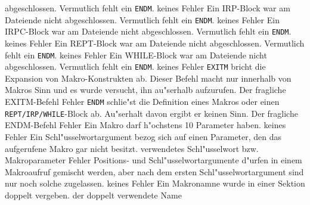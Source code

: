\documentclass[12pt,a4paper,twoside]{report}
\newcommand{\tty}[1]{{\tt #1}}
\begin{document}
\begin{description}
{                abgeschlossen.  Vermutlich fehlt ein \tty{ENDM}.}
               {keines}
               {Fehler}
               {Ein IRP-Block war am Dateiende nicht
                abgeschlossen.  Vermutlich fehlt ein \tty{ENDM}.}
               {keines}
               {Fehler}
               {Ein IRPC-Block war am Dateiende nicht
                abgeschlossen.  Vermutlich fehlt ein \tty{ENDM}.}
               {keines}
               {Fehler}
               {Ein REPT-Block war am Dateiende nicht
                abgeschlossen.  Vermutlich fehlt ein \tty{ENDM}.}
               {keines}
               {Fehler}
               {Ein WHILE-Block war am Dateiende nicht
                abgeschlossen.  Vermutlich fehlt ein \tty{ENDM}.}
               {keines}
               {Fehler}
               {\tty{EXITM} bricht die Expansion von
                Makro-Konstrukten ab.  Dieser Befehl macht nur innerhalb
                von Makros Sinn und es wurde versucht, ihn au"serhalb
                aufzurufen.}
               {Der fragliche EXITM-Befehl}
               {Fehler}
               {\tty{ENDM} schlie"st die Definition eines Makros oder einen
                \tty{REPT/IRP/WHILE}-Block ab.  Au"serhalt davon ergibt
                er keinen Sinn.}
               {Der fragliche ENDM-Befehl}
               {Fehler}
               {Ein Makro darf h"ochstens 10 Parameter haben.}
               {keines}
               {Fehler}
               {Ein Schl"usselwortargument bezog sich auf einen
                Parameter, den das aufgerufene Makro gar nicht
                besitzt.}
               {verwendetes Schl"usselwort bzw. Makroparameter}
               {Fehler}
               {Positions- und Schl"usselwortargumente d"urfen in
                einem Makroaufruf gemischt werden, aber nach dem
                ersten Schl"usselwortargument sind nur noch
                solche zugelassen.}
               {keines}
               {Fehler}
               {Ein Makronamne wurde in einer Sektion doppelt
                vergeben.}
               {der doppelt verwendete Name}

\end{description}
\end{document}
